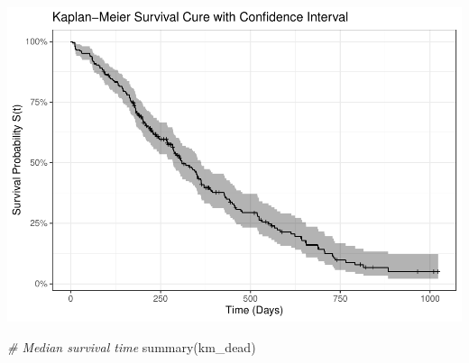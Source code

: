 \documentclass[
]{article}
\newenvironment{Shaded}{\begin{snugshade}}{\end{snugshade}}
\newcommand{\CommentTok}[1]{\textcolor[rgb]{0.56,0.35,0.01}{\textit{#1}}}
\newcommand{\FunctionTok}[1]{\textcolor[rgb]{0.00,0.00,0.00}{#1}}
\newcommand{\NormalTok}[1]{#1}
\begin{document}
\includegraphics{final_project_files/figure-latex/unnamed-chunk-10-1.pdf}

\begin{Shaded}
\begin{Highlighting}[]
\CommentTok{\# Median survival time}
\FunctionTok{summary}\NormalTok{(km\_dead)}
\end{Highlighting}
\end{Shaded}
\end{document}
